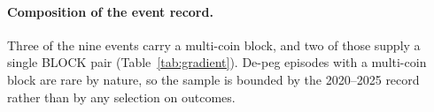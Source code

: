\paragraph{Composition of the event record.} Three of the nine events carry a multi-coin block, and two of those supply a single BLOCK pair (Table~\ref{tab:gradient}). De-peg episodes with a multi-coin block are rare by nature, so the sample is bounded by the 2020--2025 record rather than by any selection on outcomes.
